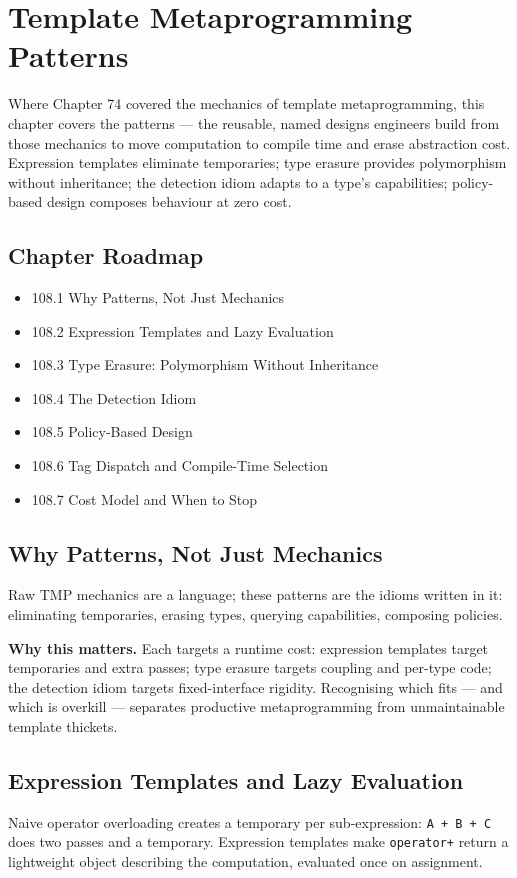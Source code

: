 \chapter{Template Metaprogramming Patterns}

Where Chapter 74 covered the mechanics of template metaprogramming, this chapter covers the patterns --- the reusable, named designs engineers build from those mechanics to move computation to compile time and erase abstraction cost. Expression templates eliminate temporaries; type erasure provides polymorphism without inheritance; the detection idiom adapts to a type's capabilities; policy-based design composes behaviour at zero cost.

\section*{Chapter Roadmap}
\begin{itemize}
\item 108.1 Why Patterns, Not Just Mechanics
\item 108.2 Expression Templates and Lazy Evaluation
\item 108.3 Type Erasure: Polymorphism Without Inheritance
\item 108.4 The Detection Idiom
\item 108.5 Policy-Based Design
\item 108.6 Tag Dispatch and Compile-Time Selection
\item 108.7 Cost Model and When to Stop
\end{itemize}

\section{Why Patterns, Not Just Mechanics}
Raw TMP mechanics are a language; these patterns are the idioms written in it: eliminating temporaries, erasing types, querying capabilities, composing policies.

\textbf{Why this matters.} Each targets a runtime cost: expression templates target temporaries and extra passes; type erasure targets coupling and per-type code; the detection idiom targets fixed-interface rigidity. Recognising which fits --- and which is overkill --- separates productive metaprogramming from unmaintainable template thickets.

\section{Expression Templates and Lazy Evaluation}
Naive operator overloading creates a temporary per sub-expression: \texttt{A + B + C} does two passes and a temporary. Expression templates make \texttt{operator+} return a lightweight object describing the computation, evaluated once on assignment.

